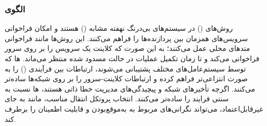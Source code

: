 \subsubsection{الگوی }
\label{distrRemMethodCallSec}
\begin{RTL}
روش‌های  () \cite{ref4}
در سیستم‌های بی‌درنگ نهفته
مشابه  () هستند
و امکان فراخوانی سرویس‌های همزمان بین پردازنده‌ها را فراهم می‌کنند.
این روش‌ها مانند فراخوانی متدهای محلی عمل می‌کنند؛
به این صورت که کلاینت یک سرویس را بر روی سرور فراخوانی می‌کند
و تا زمان تکمیل عملیات در حالت مسدود شده منتظر
می‌ماند. ها که توسط سیستم‌عامل‌های مختلف پشتیبانی می‌شوند،
ارتباطات بین فرآیندی () را به صورت انتزاعی‌تر
فراهم کرده و ارتباطات کلاینت-سرور را بر روی
شبکه‌ها ساده‌تر می‌کنند. اگرچه تأخیرهای شبکه
و پیچیدگی‌های مدیریت خطا ذاتی هستند، ها نسبت به
 سنتی فرایند را ساده‌تر می‌کنند. انتخاب پروتکل
انتقال مناسب، مانند  به جای  غیرقابل‌اعتماد،
می‌تواند نگرانی‌های مربوط به به‌موقع‌بودن و قابلیت اطمینان را برطرف کند.
\end{RTL}